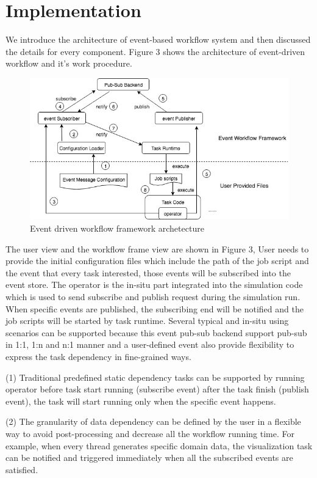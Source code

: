 
\section{Implementation}
We introduce the architecture of event-based workflow system and then discussed the details for every component. Figure 3 shows the architecture of event-driven workflow and it's work procedure.

\begin{figure} 
\centering
\includegraphics[width=1\linewidth]{./figure/edflowarchitecture.jpg}
\caption{Event driven workflow framework archetecture}
 \label{fg:state}
\end{figure} 


The user view and the workflow frame view are shown in Figure 3,  User needs to provide the initial configuration files which include the path of the job script and the event that every task interested, those events will be subscribed into the event store. The operator is the in-situ part integrated into the simulation code which is used to send subscribe and publish request during the simulation run. When specific events are published, the subscribing end will be notified and the job scripts will be started by task runtime. Several typical and in-situ using scenarios can be supported because this event pub-sub backend support pub-sub in 1:1, 1:n and n:1 manner and a user-defined event also provide flexibility to express the task dependency in fine-grained ways. 

(1) Traditional predefined static dependency tasks can be supported by running operator before task start running (subscribe event) after the task finish (publish event), the task will start running only when the specific event happens.

(2) The granularity of data dependency can be defined by the user in a flexible way to avoid post-processing and decrease all the workflow running time. For example, when every thread generates specific domain data, the visualization task can be notified and triggered immediately when all the subscribed events are satisfied.

